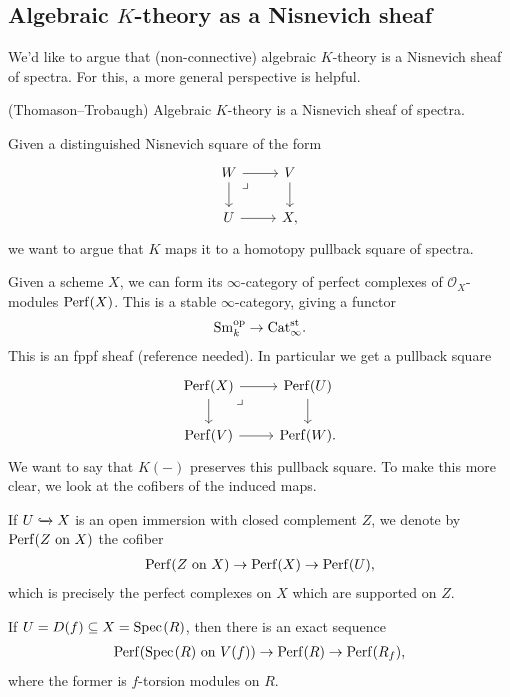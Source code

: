 \documentclass[11pt,openany]{book}
\begin{document}
\subsection{Algebraic $K$-theory as a Nisnevich sheaf}

We'd like to argue that (non-connective) algebraic $K$-theory is a Nisnevich sheaf of spectra. For this, a more general perspective is helpful.

\begin{theorem} (Thomason--Trobaugh) Algebraic $K$-theory is a Nisnevich sheaf of spectra.
\end{theorem}

Given a distinguished Nisnevich square of the form
\[ \begin{tikzcd}
    W\rar\dar\pb & V\dar\\
    U\rar & X,
\end{tikzcd} \]
we want to argue that $K$ maps it to a homotopy pullback square of spectra.

Given a scheme $X$, we can form its $\infty$-category of perfect complexes of $\mathcal{O}_X$-modules $\mathrm{Perf}(X)$. This is a stable $\infty$-category, giving a functor
\begin{align*}
    \mathrm{Sm}_k^{\mathrm{op}} \to \mathrm{Cat}_\infty^{\mathrm{st}}.
\end{align*}
%
This is an fppf sheaf (reference needed). In particular we get a pullback square
\[ \begin{tikzcd}
    \Perf(X)\rar\dar\pb & \Perf(U)\dar\\
    \Perf(V)\rar & \Perf(W).
\end{tikzcd} \]
We want to say that $K(-)$ preserves this pullback square. To make this more clear, we look at the cofibers of the induced maps.

\begin{notation} If $U \xhookrightarrow{} X$ is an open immersion with closed complement $Z$, we denote by $\mathrm{Perf}(Z\text{ on }X)$ the cofiber
\begin{align*}
    \mathrm{Perf}(Z\text{ on }X) \to \mathrm{Perf}(X) \to \mathrm{Perf}(U),
\end{align*}
which is precisely the perfect complexes on $X$ which are supported on $Z$.
\end{notation}

\begin{example} If $U = D(f) \subseteq X = \text{Spec}\hspace{0.1em}(R)$, then there is an exact sequence
\begin{align*}
    \mathrm{Perf}(\text{Spec}\hspace{0.1em}(R) \text{ on } V(f)) \to \mathrm{Perf}(R) \to \mathrm{Perf}(R_f),
\end{align*}
where the former is $f$-torsion modules on $R$.
\end{example}
\end{document}
